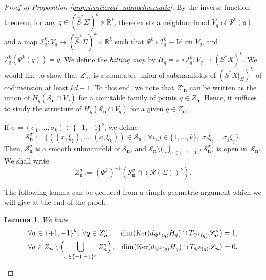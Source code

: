\documentclass[10pt]{amsart}
\let\mathcal\mathscr
\let\sep\mid
\DeclareMathOperator{\Ker}{Ker}
\theoremstyle{plain}
\newtheorem{lemma}[theorem]{Lemma}
\theoremstyle{definition}
\newcommand{\R}{\mathbb{R}}
\def\calS{\mathcal{S}}
\begin{document}
\begin{proof}[Proof of Proposition \ref{prop:irrational_monochromatic}]
By the inverse function theorem, for any $q\in (\hat{S}^*\Sigma)^k \times \R^k$, there exists a neighbourhood $V_q$ of $\Psi^k(q)$ and a map $\mathcal{I}^k_q : V_q \to (\hat{S}^*\Sigma)^k \times \R^k$ such that $\Psi^k \circ \mathcal{I}^k_q \equiv \mathrm{Id}$ on $V_q$, and $\mathcal{I}^k_q (\Psi^k(q)) = q$. We define the \emph{hitting map} by $H_q = \pi \circ \mathcal{I}^k_q : V_q \to (S^*X)^k$. We would like to show that $Z'_{\boldsymbol{n}}$ is a countable union of submanifolds of $(S^*X|_\Sigma)^k$ of codimension at least $kd-1$. To this end, we note that $Z'_{\boldsymbol{n}}$ can be written as the union of $H_q (\mathcal{S}_{\boldsymbol{n}} \cap V_q)$ for a countable family of points $q\in Z_{\boldsymbol{n}}$. Hence, it suffices to study the structure of $H_q (\mathcal{S}_{\boldsymbol{n}} \cap V_q)$ for a given $q\in Z_{\boldsymbol{n}}$.

If $\sigma=(\sigma_1,\dots,\sigma_k)\in\{+1,-1\}^k$, we define
\[
\calS^\sigma_{\boldsymbol{n}} := \bigl\{ ((x,\xi_1),\dots,(x,\xi_k))\in\calS_{\boldsymbol{n}} \sep \forall i,j\in\{1,\dots,k\}, \;\sigma_i\xi_i=\sigma_j\xi_j \bigr\}.
\]
Then, $\calS^\sigma_{\boldsymbol{n}}$ is a smooth submanifold of $\calS_{\boldsymbol{n}}$, and $\calS_{\boldsymbol{n}}\setminus\bigl(\bigcup_{\sigma\in\{+1,-1\}^k}\calS^\sigma_{\boldsymbol{n}}\bigr)$ is open in~$\calS_{\boldsymbol{n}}$. We shall write
\[
Z_{\boldsymbol{n}}^\sigma := (\Psi^k)^{-1} \left(\calS^\sigma_{\boldsymbol{n}} \cap (\mathcal{R}(\Sigma))^k\right).
\]

The following lemma can be deduced from a simple geometric argument which we will give at the end of the proof.

\begin{lemma}\label{lem:RanProj}
We have
\begin{align*}
&\forall \sigma\in\{+1,-1\}^k,~ \forall q \in Z_{\boldsymbol{n}}^\sigma,&\dim(\Ker(d_{\Psi^k(q)} H_q)\cap T_{\Psi^k(q)}\calS_{\boldsymbol{n}}^\sigma)=1,\\
&\forall q \in Z_{\boldsymbol{n}} \setminus\Bigl(\bigcup_{\sigma\in\{+1,-1\}^k}Z_{\boldsymbol{n}}^\sigma\Bigr), &\dim(\Ker(d_{\Psi^k(q)} H_q)\cap T_{\Psi^k(q)}\calS_{\boldsymbol{n}})=0.
\end{align*}
\end{lemma}


\end{proof}
\end{document}
